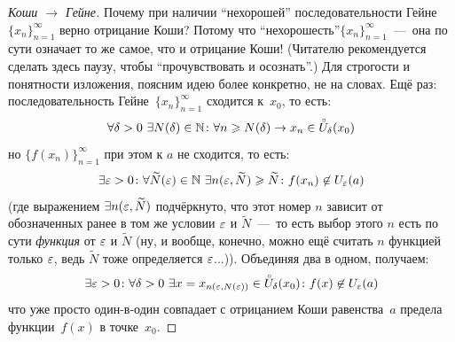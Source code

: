 \documentclass[a4paper,12pt]{article}
\renewcommand{\mathring}[1]{\accentset{\circ}{#1}}
\begin{document}
\begin{proof}[Коши $\to$ Гейне]
    Почему при наличии ``нехорошей'' последовательности Гейне~$\{x_n\}_{n=1}^{\infty}$ верно отрицание Коши?
    Потому что ``нехорошесть''$\{x_n\}_{n=1}^{\infty}$~---~она по сути означает то же самое, что и отрицание Коши!
    (Читателю рекомендуется сделать здесь паузу, чтобы ``прочувствовать и осознать''.)
    Для строгости и понятности изложения, поясним идею более конкретно, не на словах.
    Ещё раз: последовательность Гейне~$\{x_n\}_{n=1}^{\infty}$ сходится к~$x_0$, то есть:
    \[
      \forall \delta > 0\ \exists N(\delta) \in \NN\colon \forall n \geq N(\delta) \to x_n \in \mathring U_{\delta}(x_0)
    \]
    но $\{f(x_n)\}_{n = 1}^{\infty}$ при этом к $a$ не сходится, то есть:
    \[
      \exists \varepsilon > 0\colon \forall \widetilde N(\varepsilon) \in \mathbb N\ \exists n(\varepsilon, \widetilde N) \geqslant \widetilde N\colon f(x_n) \not\in U_{\varepsilon}(a)
    \]
    (где выражением $\exists n(\varepsilon, \widetilde N)$ подчёркнуто, что этот номер $n$ зависит от обозначенных ранее в том же условии $\varepsilon$ и $\widetilde N$~---~то есть выбор этого $n$ есть по сути \emph{функция} от $\varepsilon$ и $\widetilde N$ (ну, и вообще, конечно, можно ещё считать $n$ функцией только $\varepsilon$, ведь $\widetilde N$ тоже определяется $\varepsilon$...)).
    Объединяя два в одном, получаем:
    \[
      \exists \eps > 0\colon \forall \delta > 0\ \exists x = x_{n(\eps, N(\eps))} \in \mathring U_{\delta}(x_0)\colon f(x) \not\in U_{\eps}(a)
    \]
    что уже просто один-в-один совпадает с отрицанием Коши равенства~$a$ предела функции~$f(x)$ в точке~$x_0$.
  \end{proof}
\end{document}
